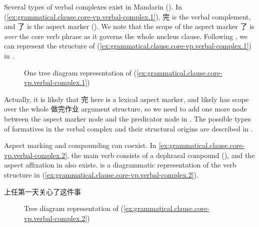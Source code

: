 \documentclass[UTF8, a4paper, oneside, scheme=plain, 12pt]{ctexrep}
\begin{document}
Several types of verbal complexes exist in Mandarin
().
In (\ref{ex:grammatical.clause.core-vp.verbal-complex.1}),
完 is the verbal complement, and 了 is the aspect marker
().
We note that the scope of the aspect marker 了 is \emph{over} the core verb phrase
as it governs the whole nucleus clause.
Following ,
we can represent the structure of (\ref{ex:grammatical.clause.core-vp.verbal-complex.1})
in .

\begin{figure}[H]
    \centering
    {
        \small
        
    }
    \caption{One tree diagram representation of (\ref{ex:grammatical.clause.core-vp.verbal-complex.1})}
    \label{fig:grammatical.clause.core-vp.verbal-complex.1.1}
\end{figure}

Actually, it is likely that 完 here is a lexical aspect marker,
and likely has scope over the whole 做完作业 argument structure,
so we need to add one more node between the aspect marker node
and the predicator node in .
The possible types of formatives in the verbal complex
and their structural origins are described in .

Aspect marking and compounding can coexist.
In \ref{ex:grammatical.clause.core-vp.verbal-complex.2},
the main verb consists of a dephrasal compound (),
and the aspect affixation in  also exists.
is a diagrammatic representation of the verb structure in (\ref{ex:grammatical.clause.core-vp.verbal-complex.2}).


\begin{exe}
    \ex\label{ex:grammatical.clause.core-vp.verbal-complex.2} 上任第一天关心了这件事
\end{exe}

\begin{figure}[H]
    {
        \centering
        \small
        
    }
    \caption{Tree diagram representation of (\ref{ex:grammatical.clause.core-vp.verbal-complex.2})}
    \label{fig:grammatical.clause.core-vp.verbal-complex.2}
\end{figure}
\end{document}
